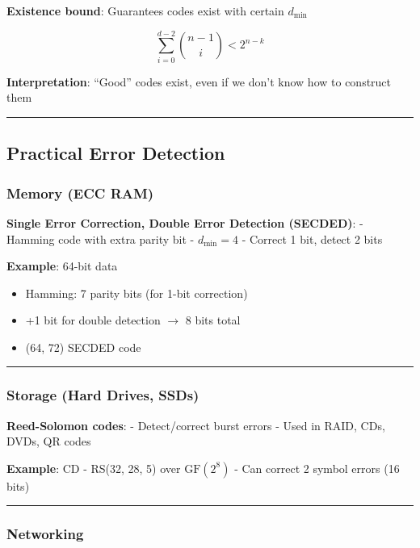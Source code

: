 \textbf{Existence bound}: Guarantees codes exist with certain
\(d_{\min}\)

\[
\sum_{i=0}^{d-2} \binom{n-1}{i} < 2^{n-k}
\]

\textbf{Interpretation}: ``Good'' codes exist, even if we don't know how to construct them

\begin{center}\rule{0.5\linewidth}{0.5pt}\end{center}

\subsection{Practical Error Detection}\label{practical-error-detection}

\subsubsection{Memory (ECC RAM)}\label{memory-ecc-ram}

\textbf{Single Error Correction, Double Error Detection (SECDED)}: -
Hamming code with extra parity bit - \(d_{\min} = 4\) - Correct 1 bit,
detect 2 bits

\textbf{Example}: 64-bit data
\begin{itemize}
\item Hamming: 7 parity bits (for 1-bit correction)
\item +1 bit for double detection $\rightarrow$ 8 bits total
\item (64, 72) SECDED code
\end{itemize}

\begin{center}\rule{0.5\linewidth}{0.5pt}\end{center}

\subsubsection{Storage (Hard Drives,
SSDs)}\label{storage-hard-drives-ssds}

\textbf{Reed-Solomon codes}: - Detect/correct burst errors - Used in
RAID, CDs, DVDs, QR codes

\textbf{Example}: CD - RS(32, 28, 5) over \(\mathrm{GF}(2^8)\) - Can
correct 2 symbol errors (16 bits)

\begin{center}\rule{0.5\linewidth}{0.5pt}\end{center}

\subsubsection{Networking}\label{networking}

